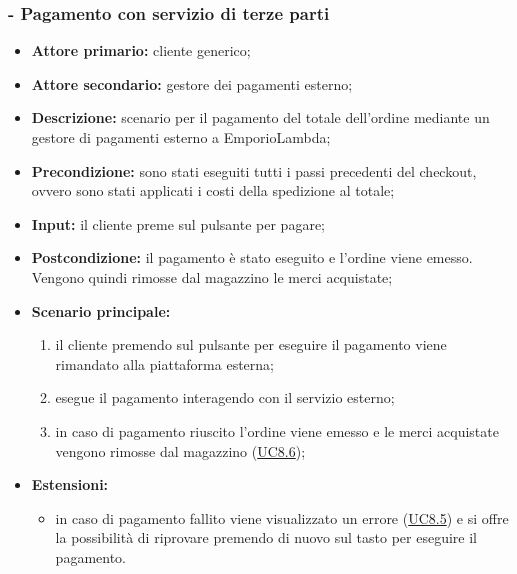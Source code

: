 \stepsubUserCase
\subsubsection{ - Pagamento con servizio di terze parti}
\begin{itemize}
    \item \textbf{Attore primario:} cliente generico;
    \item \textbf{Attore secondario:} gestore dei pagamenti esterno;
    \item \textbf{Descrizione:} scenario per il pagamento del totale dell'ordine mediante un gestore di pagamenti esterno a EmporioLambda;
    \item \textbf{Precondizione:} sono stati eseguiti tutti i passi precedenti del checkout, ovvero sono stati applicati i costi della spedizione al totale;
    \item \textbf{Input:} il cliente preme sul pulsante per pagare;
    \item \textbf{Postcondizione:} il pagamento è stato eseguito e l'ordine viene emesso. Vengono quindi rimosse dal magazzino le merci acquistate;
    \item \textbf{Scenario principale:}
    \begin{enumerate}
        \item il cliente premendo sul pulsante per eseguire il pagamento viene rimandato alla piattaforma esterna;
        \item esegue il pagamento interagendo con il servizio esterno;
        \item in caso di pagamento riuscito l'ordine viene emesso e le merci acquistate vengono rimosse dal magazzino (\hyperref[UC8.6]{UC8.6});
    \end{enumerate}
    \item \textbf{Estensioni:} 
    \begin{itemize}
        \item in caso di pagamento fallito viene visualizzato un errore (\hyperref[UC8.5]{UC8.5}) e si offre la possibilità di riprovare premendo di nuovo sul tasto per eseguire il pagamento.
    \end{itemize}
\end{itemize}

\stepsubUserCase

